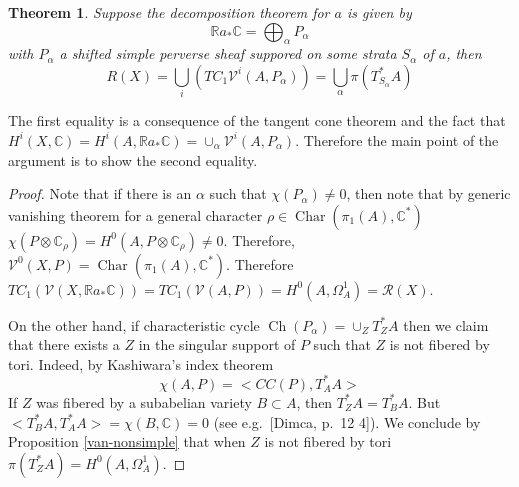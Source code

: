 \documentclass[11pt,reqno]{amsart}
\newtheorem{alphtheorem}{Theorem}
\theoremstyle{definition}
\theoremstyle{remark}
\theoremstyle{cited}
\theoremstyle{citeddef}
\DeclareMathOperator{\Char}{Char}
\newcommand{\sR}{\mathcal{R}}
\newcommand\sV{{\mathcal V}}
\newcommand{\bbC}{\mathbb{C}}
\newcommand{\bbR}{\mathbb{R}}
\DeclareMathOperator{\Ch}{Ch}
\begin{document}
\begin{alphtheorem}
Suppose the decomposition theorem
for $a$ is given by
\[\bbR a_*\bbC = \bigoplus_{\alpha}P_{\alpha}\]
with $P_{\alpha}$ a shifted simple perverse sheaf suppored on some strata $S_{\alpha}$ of $a$, then
\[R(X) = \bigcup_i (TC_1 \sV^i(A, P_{\alpha})) = \bigcup_{\alpha}\pi(T^*_{S_{\alpha}}A) \]
\end{alphtheorem}

The first equality is a consequence of the tangent cone theorem and the fact that
$H^i(X, \bbC) = H^i(A, \bbR a_*\bbC) = \cup_{\alpha} \sV^i(A, P_{\alpha})$.
Therefore the main point of the argument is to show the second equality.

\begin{proof}
Note that if there is an $\alpha$ such that $\chi(P_{\alpha}) \neq 0$, then note that by generic vanishing theorem for
a general character $\rho \in \Char(\pi_1(A), \bbC^*)$ $\chi(P\otimes \bbC_{\rho}) = H^0(A, P\otimes \bbC_{\rho}) \neq 0$. Therefore,
$\sV^0(X, P) = \Char(\pi_1(A), \bbC^*)$. Therefore $TC_1(\sV(X, \bbR a_*\bbC)) = TC_1(\sV(A, P)) = H^0(A, \Omega_A^1) =  \sR(X)$.

On the other hand, if characteristic cycle $\Ch(P_{\alpha}) = \cup_Z T^*_ZA$ then we claim that there exists a $Z$ in the singular support of $P$ such that
$Z$ is not fibered by tori. Indeed,
by Kashiwara's index theorem 
\[\chi(A,P) = <CC(P), T^*_AA>\]
If $Z$ was fibered by a subabelian variety $B\subset A$, then $T^*_ZA = T^*_BA$. But $<T^*_BA, T^*_AA> = \chi(B, \bbC) = 0$ (see e.g.\ [Dimca, p.\ 12	4]).
We conclude by Proposition \ref{van-nonsimple} that when $Z$ is not fibered by tori $\pi(T^*_ZA) = H^0(A,\Omega_A^1)$. 


\end{proof}
\end{document}

